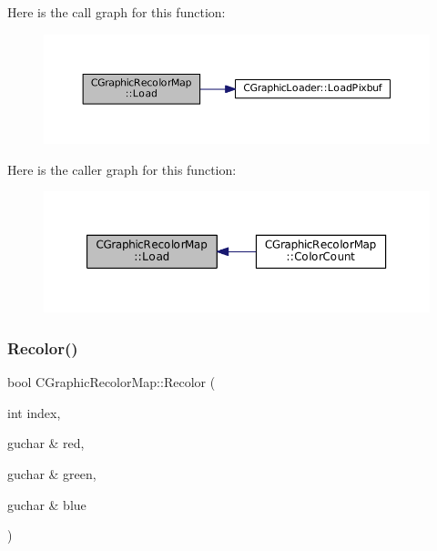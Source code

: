 Here is the call graph for this function\+:
\nopagebreak
\begin{figure}[H]
\begin{center}
\leavevmode
\includegraphics[width=350pt]{classCGraphicRecolorMap_a71b26547c2e943036278611d048afdfb_cgraph}
\end{center}
\end{figure}
Here is the caller graph for this function\+:
\nopagebreak
\begin{figure}[H]
\begin{center}
\leavevmode
\includegraphics[width=350pt]{classCGraphicRecolorMap_a71b26547c2e943036278611d048afdfb_icgraph}
\end{center}
\end{figure}
\hypertarget{classCGraphicRecolorMap_a338087373145b89a29902b50276358d1}{}\label{classCGraphicRecolorMap_a338087373145b89a29902b50276358d1} 
\subsubsection{\texorpdfstring{Recolor()}{Recolor()}}
{\footnotesize\ttfamily bool C\+Graphic\+Recolor\+Map\+::\+Recolor (\begin{DoxyParamCaption}\item[{int}]{index,  }\item[{guchar \&}]{red,  }\item[{guchar \&}]{green,  }\item[{guchar \&}]{blue }\end{DoxyParamCaption})}



